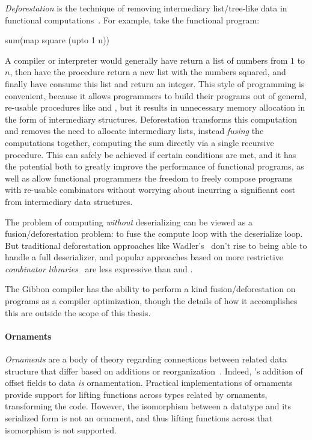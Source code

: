 \emph{Deforestation} is the technique of removing intermediary list/tree-like
data in functional computations~\cite{wadler-deforestation}.
%
For example, take the functional program:
\begin{code}
  sum(map square (upto 1 n))
\end{code}
A compiler or interpreter would generally have  return a list of
numbers from $1$ to $n$, then have the  procedure return a new list with
the numbers squared, and finally have  consume this list and return an
integer. This style of programming is convenient, because it allows programmers
to build their programs out of general, re-usable procedures like  and
, but it results in unnecessary memory allocation in the form of
intermediary structures. Deforestation transforms this computation and removes
the need to allocate intermediary lists, instead \emph{fusing} the computations
together, computing the sum directly via a single recursive procedure. This can
safely be achieved if certain conditions are met, and it has the potential both
to greatly improve the performance of functional programs, as well as allow
functional programmers the freedom to freely compose programs with re-usable
combinators without worrying about incurring a significant cost from
intermediary data structures.

The problem of computing \emph{without} deserializing can be viewed as a
fusion/deforestation problem: to fuse the compute loop with the deserialize
loop. But traditional deforestation approaches like
Wadler's~\cite{wadler-deforestation} don't rise to being able to handle a full
deserializer, and popular approaches based on more restrictive \emph{combinator
libraries}~\cite{stream-fusion} are less expressive than \lamadt{} and
\ourcalc{}.

The Gibbon compiler has the ability to perform a kind fusion/deforestation on
\lamadt{} programs as a compiler optimization, though the details of how it
accomplishes this are outside the scope of this thesis.

\paragraph{Ornaments}

\emph{Ornaments} are a body of theory regarding connections between related
data structure that differ based on additions or
reorganization~\cite{ornaments}.
%
Indeed, \ourcalc's addition of offset fields to data \emph{is} ornamentation.
%
Practical implementations of ornaments~\cite{ornament-ml} provide support for
lifting functions across types related by ornaments, transforming the code.
%
However, the isomorphism between a datatype and its serialized form is not an
ornament, and thus lifting functions across that isomorphism is not supported.


